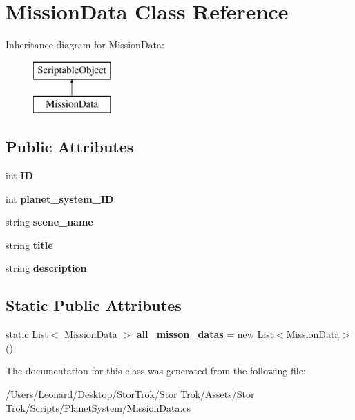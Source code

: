 \hypertarget{class_mission_data}{}\section{Mission\+Data Class Reference}
\label{class_mission_data}
Inheritance diagram for Mission\+Data\+:\begin{figure}[H]
\begin{center}
\leavevmode
\includegraphics[height=2.000000cm]{class_mission_data}
\end{center}
\end{figure}
\subsection*{Public Attributes}
\begin{DoxyCompactItemize}
\item 
\mbox{\label{class_mission_data_a6afc5ff5ddb309b831a55f12b48027ab}} 
int {\bfseries ID}
\item 
\mbox{\label{class_mission_data_ab48eb25317f3d91e77d46f15721b90f8}} 
int {\bfseries planet\+\_\+system\+\_\+\+ID}
\item 
\mbox{\label{class_mission_data_add60fd614e36666f17fc74e102fd99bd}} 
string {\bfseries scene\+\_\+name}
\item 
\mbox{\label{class_mission_data_ab33174ebf8bed859623c5ec422691808}} 
string {\bfseries title}
\item 
\mbox{\label{class_mission_data_ae30ca292edaa7d3e09ec8beee9b0b214}} 
string {\bfseries description}
\end{DoxyCompactItemize}
\subsection*{Static Public Attributes}
\begin{DoxyCompactItemize}
\item 
\mbox{\label{class_mission_data_a0b2830f0d97e90ef5fa1362128e0e16b}} 
static List$<$ \hyperlink{class_mission_data}{Mission\+Data} $>$ {\bfseries all\+\_\+misson\+\_\+datas} = new List$<$\hyperlink{class_mission_data}{Mission\+Data}$>$()
\end{DoxyCompactItemize}


The documentation for this class was generated from the following file\+:\begin{DoxyCompactItemize}
\item 
/\+Users/\+Leonard/\+Desktop/\+Stor\+Trok/\+Stor Trok/\+Assets/\+Stor Trok/\+Scripts/\+Planet\+System/Mission\+Data.\+cs\end{DoxyCompactItemize}
